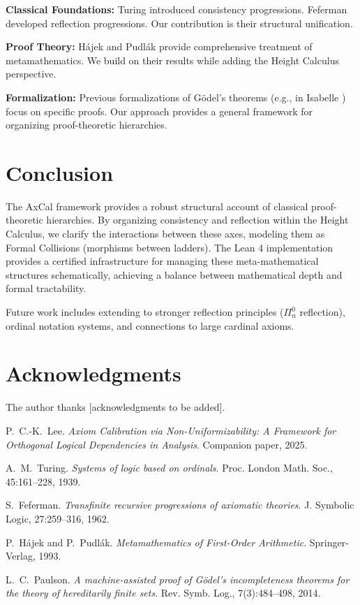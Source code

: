 \documentclass[11pt]{article}
\begin{document}
\textbf{Classical Foundations:} Turing \cite{Turing1939} introduced consistency progressions. Feferman \cite{Feferman1962} developed reflection progressions. Our contribution is their structural unification.

\textbf{Proof Theory:} Hájek and Pudlák \cite{HajekPudlak} provide comprehensive treatment of metamathematics. We build on their results while adding the Height Calculus perspective.

\textbf{Formalization:} Previous formalizations of Gödel's theorems (e.g., in Isabelle \cite{Paulson}) focus on specific proofs. Our approach provides a general framework for organizing proof-theoretic hierarchies.

\section{Conclusion}
The AxCal framework provides a robust structural account of classical proof-theoretic hierarchies. By organizing consistency and reflection within the Height Calculus, we clarify the interactions between these axes, modeling them as Formal Collisions (morphisms between ladders). The Lean 4 implementation provides a certified infrastructure for managing these meta-mathematical structures schematically, achieving a balance between mathematical depth and formal tractability.

Future work includes extending to stronger reflection principles ($\Pi^0_n$ reflection), ordinal notation systems, and connections to large cardinal axioms.

\section*{Acknowledgments}

The author thanks [acknowledgments to be added].

\begin{thebibliography}{10}

P.~C.-K.~Lee.
\emph{Axiom Calibration via Non-Uniformizability: A Framework for Orthogonal Logical Dependencies in Analysis}.
Companion paper, 2025.

A.~M.~Turing.
\emph{Systems of logic based on ordinals}.
Proc. London Math. Soc., 45:161--228, 1939.

S.~Feferman.
\emph{Transfinite recursive progressions of axiomatic theories}.
J. Symbolic Logic, 27:259--316, 1962.

P.~Hájek and P.~Pudlák.
\emph{Metamathematics of First-Order Arithmetic}.
Springer-Verlag, 1993.

L.~C.~Paulson.
\emph{A machine-assisted proof of Gödel's incompleteness theorems for the theory of hereditarily finite sets}.
Rev. Symb. Log., 7(3):484--498, 2014.

\end{thebibliography}
\end{document}
